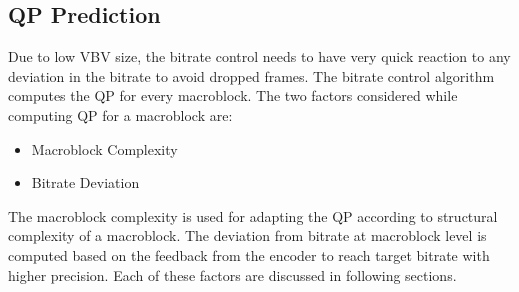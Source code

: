 \documentclass[11pt]{article} %
\begin{document}
\subsection{QP Prediction}  \label{used QP prediction overview}
  Due to low VBV size, the bitrate control needs to have very quick reaction to any deviation in the bitrate to avoid dropped frames. The bitrate control algorithm computes the QP for every macroblock. The two factors considered while computing QP for a macroblock are:
  
\begin{itemize}  
\item Macroblock Complexity
\item Bitrate Deviation
\end{itemize}
The macroblock complexity is used for adapting the QP according to structural complexity of a macroblock. The deviation from bitrate at macroblock level is computed based on the feedback from the encoder to reach target bitrate with higher precision. Each of these factors are discussed in following sections.
\end{document}
